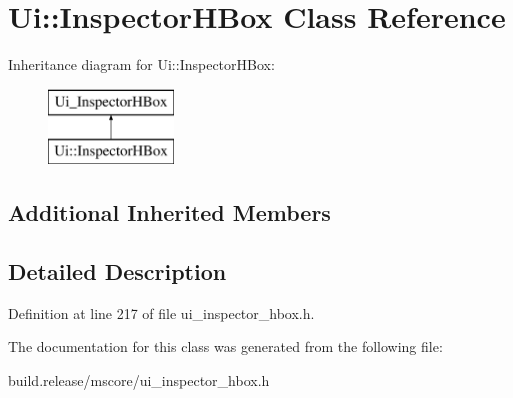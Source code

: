 \hypertarget{class_ui_1_1_inspector_h_box}{}\section{Ui\+:\+:Inspector\+H\+Box Class Reference}
\label{class_ui_1_1_inspector_h_box}
Inheritance diagram for Ui\+:\+:Inspector\+H\+Box\+:\begin{figure}[H]
\begin{center}
\leavevmode
\includegraphics[height=2.000000cm]{class_ui_1_1_inspector_h_box}
\end{center}
\end{figure}
\subsection*{Additional Inherited Members}


\subsection{Detailed Description}


Definition at line 217 of file ui\+\_\+inspector\+\_\+hbox.\+h.



The documentation for this class was generated from the following file\+:\begin{DoxyCompactItemize}
\item 
build.\+release/mscore/ui\+\_\+inspector\+\_\+hbox.\+h\end{DoxyCompactItemize}
